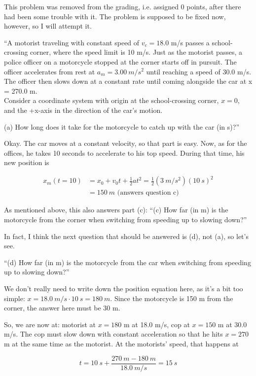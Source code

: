 \documentclass[12pt,a4paper]{report}
\begin{document}
This problem was removed from the grading, i.e. assigned 0 points, after there had been some trouble with it. The problem is supposed to be fixed now, however, so I will attempt it.

``A motorist traveling with constant speed of $v_c = 18.0$ m/s passes a school-crossing corner, where the speed limit is 10 m/s. Just as the motorist passes, a police officer on a motorcycle stopped at the corner starts off in pursuit. The officer accelerates from rest at $a_m = \SI{3.00}{m/s^2}$ until reaching a speed of 30.0 m/s. The officer then slows down at a constant rate until coming alongside the car at x = 270.0 m.\\
Consider a coordinate system with origin at the school-crossing corner, $x = 0$, and the +x-axis in the direction of the car's motion.

(a) How long does it take for the motorcycle to catch up with the car (in s)?''

Okay. The car moves at a constant velocity, so that part is easy. Now, as for the offices, he takes 10 seconds to accelerate to his top speed. During that time, his new position is

\begin{align}
x_m(t=10) &= x_0 + v_0 t + \frac{1}{2} a t^2 = \frac{1}{2} (\SI{3}{m/s^2}) (\SI{10}{s})^2\\
          &= \SI{150}{m} \text{ (answers question c)}
\end{align}

As mentioned above, this also  answers part (c): ``(c) How far (in m) is the motorcycle from the corner when switching from speeding up to slowing down?''

In fact, I think the next question that should be answered is (d), not (a), so let's see.

``(d) How far (in m) is the motorcycle from the car when switching from speeding up to slowing down?''

We don't really need to write down the position equation here, as it's a bit too simple: $x = \SI{18.0}{m/s} \cdot \SI{10}{s} = \SI{180}{m}$. Since the motorcycle is 150 m from the corner, the answer here must be 30 m.

So, we are now at: motorist at $x = 180$ m at 18.0 m/s, cop at $x = 150$ m at 30.0 m/s. The cop must slow down with constant acceleration so that he hits $x = 270$ m at the same time as the motorist. At the motorists' speed, that happens at

\begin{equation}
t = \SI{10}{s} + \frac{\SI{270}{m} - \SI{180}{m}}{\SI{18.0}{m/s}} = \SI{15}{s}
\end{equation}
\end{document}
